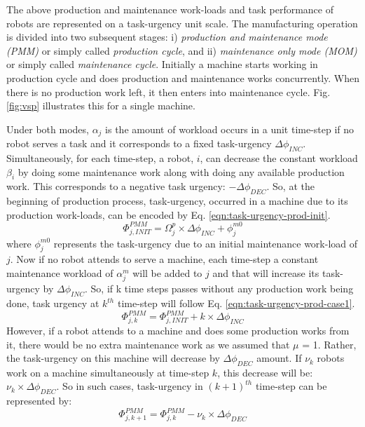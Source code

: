 \documentclass[smallcondensed]{svjour3}
\begin{document}
The above production and maintenance work-loads and task performance of robots are represented on a task-urgency unit scale.  The manufacturing operation is divided into two subsequent stages: i) {\em production and maintenance mode (PMM)} or simply called {\em production cycle}, and ii) {\em maintenance only mode (MOM)} or simply called {\em maintenance cycle}. Initially a machine starts working in production cycle and does production and maintenance works concurrently. When there is no production work left, it then enters into maintenance cycle. Fig. \ref{fig:vsp} illustrates this for a single machine.

Under both modes, $\alpha_{j}$ is the amount of workload occurs in a unit time-step if no robot serves a task and it corresponds to a fixed task-urgency $\Delta \phi_{INC}$.  Simultaneously, for each time-step, a robot, $i$, can decrease the constant workload $\beta_{i}$ by doing some maintenance work along with doing any available production work.  This corresponds to a negative task urgency: $- \Delta \phi_{DEC}$. 
So, at the beginning of production process, task-urgency, occurred in a machine due to its production work-loads, can be encoded by Eq. \ref{eqn:task-urgency-prod-init}.
\begin{equation}
\Phi_{j, INIT}^{PMM} = \Omega_{j}^{p} \times \Delta \phi_{INC} + \phi_{j}^{m0}
\label{eqn:task-urgency-prod-init}
\end{equation}
where $\phi_{j}^{m0}$ represents the task-urgency due to an initial maintenance work-load of $j$.
Now if no robot attends to serve a machine, each time-step a constant maintenance workload of $\alpha_{j}^{m}$ will be added to $j$ and that will increase its task-urgency by $\Delta \phi_{INC}$. So, if k time steps passes without any production work being done, task urgency at $k^{th}$ time-step will follow Eq. \ref{eqn:task-urgency-prod-case1}.
\begin{equation}
\Phi_{j, k}^{PMM} =\Phi_{j, INIT}^{PMM} + k \times \Delta \phi_{INC}
\label{eqn:task-urgency-prod-case1}
\end{equation}
However, if a robot attends to a machine and does some production works from it, there would be no extra maintenance work as we assumed that $\mu$ = 1. Rather, the task-urgency on this machine will decrease by $\Delta \phi_{DEC}$ amount. If $\nu_{k}$ robots work on a machine simultaneously at time-step $k$, this decrease will be: $\nu_{k} \times \Delta \phi_{DEC}$. So in such cases, task-urgency in $(k+1)^{th}$ time-step can be represented by:
\begin{equation}
\Phi_{j, k+1}^{PMM} = \Phi_{j, k}^{PMM} - \nu_{k} \times \Delta \phi_{DEC}
\label{eqn:task-urgency-prod-case2}
\end{equation}
\end{document}
